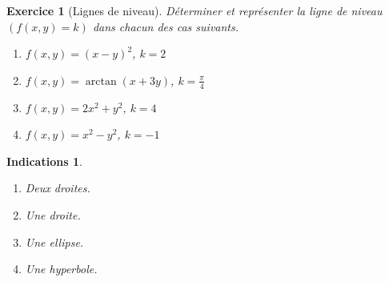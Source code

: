 \documentclass[11pt,a4paper]{article}
\theoremstyle{exostyle}
\newtheorem{exo}{Exercice}
\newtheorem{ind}{Indications}
\newcommand{\exercice}[1]{} \newcommand{\finexercice}{}
\newcommand{\enonce}{\begin{exo}} \newcommand{\finenonce}{\end{exo}}
\newcommand{\indication}{\begin{ind}} \newcommand{\finindication}{\end{ind}}
\begin{document}
	
\exercice{}
\enonce[Lignes de niveau]
Déterminer et représenter la ligne de niveau $(f(x,y)=k)$ dans chacun des cas suivants.
\begin{enumerate}
	\item $f(x,y) = (x-y)^2$, $k=2$
	\item $f(x,y) = \arctan(x+3y)$, $k=\frac\pi4$
	\item $f(x,y) = 2x^2 + y^2$, $k=4$
	\item $f(x,y) = x^2-y^2$, $k = -1$
\end{enumerate}
\finenonce

\indication
\begin{enumerate}
	\item Deux droites.
	\item Une droite.
	\item Une ellipse.
	\item Une hyperbole.
\end{enumerate}
\finindication
\end{document}
